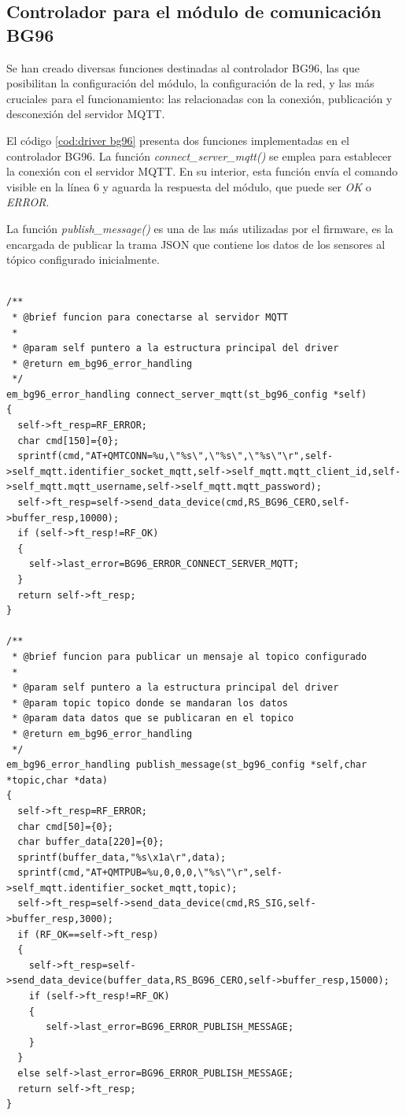\subsection{ Controlador para el módulo de comunicación BG96 } 
Se han creado diversas funciones destinadas al controlador BG96, las que posibilitan la configuración del módulo, la configuración de la red, y las más cruciales para el funcionamiento: las relacionadas con la conexión, publicación y desconexión del servidor MQTT.

El código \ref{cod:driver bg96} presenta dos funciones implementadas en el controlador BG96. La función \emph{connect\_server\_mqtt()} se emplea para establecer la conexión con el servidor MQTT. En su interior, esta función envía el comando visible en la línea 6 y aguarda la respuesta del módulo, que puede ser \emph{OK} o \emph{ERROR}.

La función \emph{publish\_message()} es una de las más utilizadas por el firmware, es la encargada de publicar la trama JSON que contiene los datos de los sensores al tópico configurado inicialmente. 
\begin{lstlisting}[label=cod:driver bg96,caption=Función de conexión y publicación al broker MQTT.]  % Start your code-block

/**
 * @brief funcion para conectarse al servidor MQTT
 * 
 * @param self puntero a la estructura principal del driver
 * @return em_bg96_error_handling 
 */
em_bg96_error_handling connect_server_mqtt(st_bg96_config *self)
{
  self->ft_resp=RF_ERROR;
  char cmd[150]={0};
  sprintf(cmd,"AT+QMTCONN=%u,\"%s\",\"%s\",\"%s\"\r",self->self_mqtt.identifier_socket_mqtt,self->self_mqtt.mqtt_client_id,self->self_mqtt.mqtt_username,self->self_mqtt.mqtt_password);
  self->ft_resp=self->send_data_device(cmd,RS_BG96_CERO,self->buffer_resp,10000);
  if (self->ft_resp!=RF_OK)
  {
    self->last_error=BG96_ERROR_CONNECT_SERVER_MQTT;
  }
  return self->ft_resp;
}

/**
 * @brief funcion para publicar un mensaje al topico configurado 
 * 
 * @param self puntero a la estructura principal del driver
 * @param topic topico donde se mandaran los datos
 * @param data datos que se publicaran en el topico
 * @return em_bg96_error_handling 
 */
em_bg96_error_handling publish_message(st_bg96_config *self,char *topic,char *data)
{
  self->ft_resp=RF_ERROR;
  char cmd[50]={0};
  char buffer_data[220]={0};
  sprintf(buffer_data,"%s\x1a\r",data);
  sprintf(cmd,"AT+QMTPUB=%u,0,0,0,\"%s\"\r",self->self_mqtt.identifier_socket_mqtt,topic);
  self->ft_resp=self->send_data_device(cmd,RS_SIG,self->buffer_resp,3000);
  if (RF_OK==self->ft_resp)
  {
    self->ft_resp=self->send_data_device(buffer_data,RS_BG96_CERO,self->buffer_resp,15000);
    if (self->ft_resp!=RF_OK)
    {
       self->last_error=BG96_ERROR_PUBLISH_MESSAGE;
    }   
  }
  else self->last_error=BG96_ERROR_PUBLISH_MESSAGE;
  return self->ft_resp;
}
\end{lstlisting}


